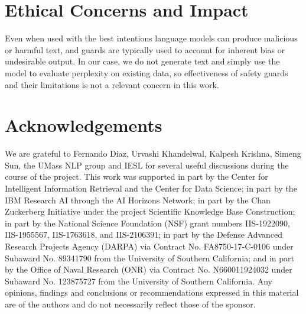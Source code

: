 \documentclass[11pt]{article}
\begin{document}
\section*{Ethical Concerns and Impact}

Even when used with the best intentions language models can produce malicious or harmful text, and guards are typically used to account for inherent bias or undesirable output. In our case, we do not generate text and simply use the model to evaluate perplexity on existing data, so effectiveness of safety guards and their limitations is not a relevant concern in this work.

\section*{Acknowledgements}

We are grateful to Fernando Diaz, Urvashi Khandelwal, Kalpesh Krishna, Simeng Sun, the UMass NLP group and IESL for several useful discussions during the course of the project. This work was supported in part by the Center for Intelligent Information Retrieval and the Center for Data Science; in part by the IBM Research AI through the AI Horizons Network; in part by the Chan Zuckerberg Initiative under the project Scientific Knowledge Base Construction; in part by the National Science Foundation (NSF) grant numbers  IIS-1922090, IIS-1955567, IIS-1763618, and IIS-2106391; in part by the Defense Advanced Research Projects Agency (DARPA) via Contract No. FA8750-17-C-0106 under Subaward No. 89341790 from the University of Southern California; and in part by the Office of Naval Research (ONR) via Contract No. N660011924032 under Subaward No. 123875727 from the University of Southern California. Any opinions, findings and conclusions or recommendations expressed in this material are of the authors and do not necessarily reflect those of the sponsor.



\end{document}
